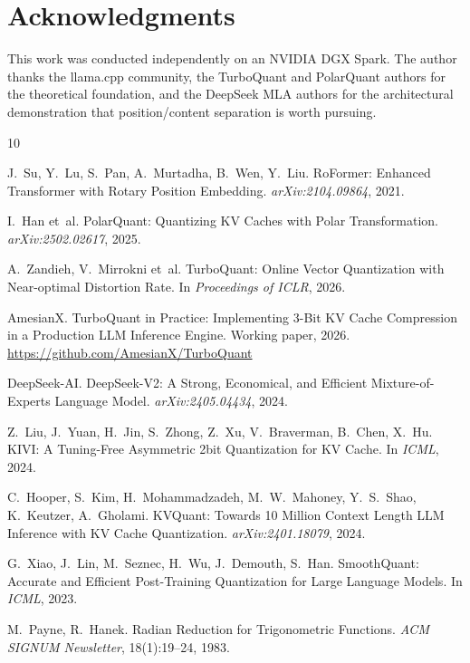 \documentclass[10pt,twocolumn]{article}
\begin{document}
\section*{Acknowledgments}

This work was conducted independently on an NVIDIA DGX Spark. The author thanks the llama.cpp community, the TurboQuant and PolarQuant authors for the theoretical foundation, and the DeepSeek MLA authors for the architectural demonstration that position/content separation is worth pursuing.


\begin{thebibliography}{10}

J.~Su, Y.~Lu, S.~Pan, A.~Murtadha, B.~Wen, Y.~Liu.
\newblock RoFormer: Enhanced Transformer with Rotary Position Embedding.
\newblock \emph{arXiv:2104.09864}, 2021.

I.~Han et~al.
\newblock PolarQuant: Quantizing KV Caches with Polar Transformation.
\newblock \emph{arXiv:2502.02617}, 2025.

A.~Zandieh, V.~Mirrokni et~al.
\newblock TurboQuant: Online Vector Quantization with Near-optimal Distortion Rate.
\newblock In \emph{Proceedings of ICLR}, 2026.

AmesianX.
\newblock TurboQuant in Practice: Implementing 3-Bit KV Cache Compression in a Production LLM Inference Engine.
\newblock Working paper, 2026.
\newblock \url{https://github.com/AmesianX/TurboQuant}

DeepSeek-AI.
\newblock DeepSeek-V2: A Strong, Economical, and Efficient Mixture-of-Experts Language Model.
\newblock \emph{arXiv:2405.04434}, 2024.

Z.~Liu, J.~Yuan, H.~Jin, S.~Zhong, Z.~Xu, V.~Braverman, B.~Chen, X.~Hu.
\newblock KIVI: A Tuning-Free Asymmetric 2bit Quantization for KV Cache.
\newblock In \emph{ICML}, 2024.

C.~Hooper, S.~Kim, H.~Mohammadzadeh, M.~W.~Mahoney, Y.~S.~Shao, K.~Keutzer, A.~Gholami.
\newblock KVQuant: Towards 10 Million Context Length LLM Inference with KV Cache Quantization.
\newblock \emph{arXiv:2401.18079}, 2024.

G.~Xiao, J.~Lin, M.~Seznec, H.~Wu, J.~Demouth, S.~Han.
\newblock SmoothQuant: Accurate and Efficient Post-Training Quantization for Large Language Models.
\newblock In \emph{ICML}, 2023.

M.~Payne, R.~Hanek.
\newblock Radian Reduction for Trigonometric Functions.
\newblock \emph{ACM SIGNUM Newsletter}, 18(1):19--24, 1983.

\end{thebibliography}
\end{document}
